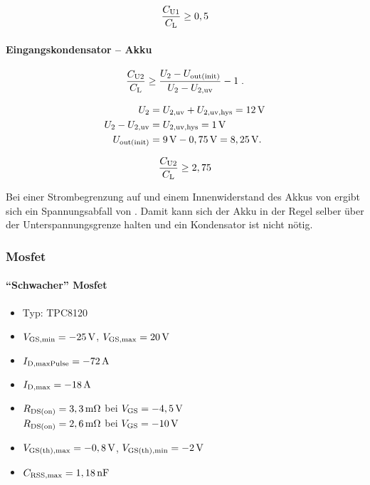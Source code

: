 \begin{align*}
	\frac{C_{\mathrm{U1}}}{C_{\mathrm{L}}} \geq 0,5
\end{align*}



\paragraph{Eingangskondensator -- Akku}


\begin{align*}
	\frac{C_{\mathrm{U2}}}{C_{\mathrm{L}}} \geq \frac{U_2 - U_{\mathrm{out(init)}}}{U_2 - U_{\mathrm{2,uv}}} - 1\;.
\end{align*}




\begin{align*}
	U_2 & = U_{\mathrm{2,uv}} + U_{\mathrm{2,uv,hys}} = 12\,\mathrm{V} \\
	U_2 - U_{\mathrm{2,uv}} & = U_{\mathrm{2,uv,hys}} = 1\,\mathrm{V} \\
	U_{\mathrm{out(init)}} & = 9\,\mathrm{V} - 0,75\,\mathrm{V} = 8,25\,\mathrm{V}.
\end{align*}


\begin{align*}
	\frac{C_{\mathrm{U2}}}{C_{\mathrm{L}}} \geq 2,75
\end{align*}


Bei einer Strombegrenzung auf  und einem Innenwiderstand des Akkus von  ergibt sich ein Spannungsabfall von . Damit kann sich der Akku in der Regel selber über der Unterspannungsgrenze halten und ein Kondensator ist nicht nötig.



\subsubsection{Mosfet}


\paragraph{"`Schwacher"' Mosfet}
\begin{itemize}
	\item Typ: TPC8120
	\item $V_{\mathrm{GS,min}} = -25\,\mathrm{V}$, $V_{\mathrm{GS,max}} = 20\,\mathrm{V}$
	\item $I_{\mathrm{D,maxPulse}} = -72\,\mathrm{A}$
	\item $I_{\mathrm{D,max}} = -18\,\mathrm{A}$
	\item $R_{\mathrm{DS(on)}} = 3,3\,\mathrm{m\Omega}$ bei $V_{\mathrm{GS}} = -4,5\,\mathrm{V}$ \\
				$R_{\mathrm{DS(on)}} = 2,6\,\mathrm{m\Omega}$ bei $V_{\mathrm{GS}} = -10\,\mathrm{V}$
	\item $V_{\mathrm{GS(th),max}} = -0,8\,\mathrm{V}$, $V_{\mathrm{GS(th),min}} = -2\,\mathrm{V}$
	\item $C_{\mathrm{RSS,max}} = 1,18\,\mathrm{nF}$
\end{itemize}



